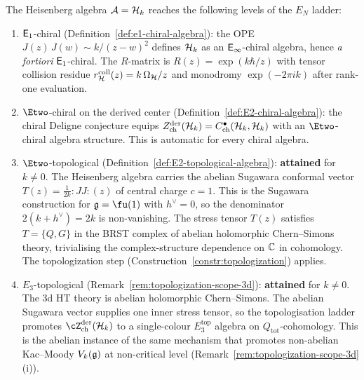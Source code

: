 \begin{remark}
\label{rem:heisenberg-EN-level}
The Heisenberg algebra $\mathcal{A} = \mathcal{H}_k$ reaches the following
levels of the $E_N$ ladder:
\begin{enumerate}[label=\textup{(\roman*)}]
\item $\mathsf{E}_1$-chiral
 (Definition~\ref{def:e1-chiral-algebra}): the OPE
 $J(z)\,J(w) \sim k/(z-w)^2$ defines $\mathcal{H}_k$ as an
 $\mathsf{E}_{\infty}$-chiral algebra, hence \emph{a fortiori}
 $\mathsf{E}_1$-chiral. The $R$-matrix is
 $R(z) = \exp(k\hbar/z)$ with tensor collision residue
 $r^{\mathrm{coll}}_{\mathcal{H}}(z)=k\,\Omega_{\mathcal{H}}/z$ and monodromy
 $\exp(-2\pi i k)$ after rank-one evaluation.

\item $\Etwo$-chiral on the derived center
 (Definition~\ref{def:E2-chiral-algebra}): the chiral
 Deligne conjecture equips
 $Z^{\mathrm{der}}_{\mathrm{ch}}(\mathcal{H}_k)
 = C^\bullet_{\mathrm{ch}}(\mathcal{H}_k, \mathcal{H}_k)$
 with an $\Etwo$-chiral algebra structure. This is
 automatic for every chiral algebra.

\item $\Etwo$-topological
 (Definition~\ref{def:E2-topological-algebra}):
 \textbf{attained} for $k \ne 0$. The Heisenberg algebra
 carries the abelian Sugawara conformal vector
 $T(z) = \frac{1}{2k}{:}JJ{:}(z)$ of central charge $c = 1$.
 This is the Sugawara construction for $\fg = \fu(1)$ with
 $h^\vee = 0$, so the denominator $2(k + h^\vee) = 2k$ is
 non-vanishing.
 The stress tensor $T(z)$ satisfies $T = \{Q, G\}$ in the
 BRST complex of abelian holomorphic Chern--Simons theory,
 trivialising the complex-structure dependence on $\mathbb{C}$ in
 cohomology. The topologization step
 (Construction~\ref{constr:topologization}) applies.

\item $E_3$-topological
 (Remark~\ref{rem:topologization-scope-3d}):
 \textbf{attained} for $k \ne 0$.
 The $3$d HT theory is abelian holomorphic Chern--Simons.
 The abelian Sugawara vector supplies one inner stress tensor, so
 the topologisation ladder promotes
 $\cZ^{\mathrm{der}}_{\mathrm{ch}}(\cH_k)$ to a single-colour
 $E_3^{\mathrm{top}}$ algebra on $Q_{\mathrm{tot}}$-cohomology.
 This is the abelian instance of the same mechanism
 that promotes non-abelian Kac--Moody $V_k(\mathfrak{g})$ at
 non-critical level
 (Remark~\ref{rem:topologization-scope-3d}\textup{(i)}).


\end{enumerate}
\end{remark}
